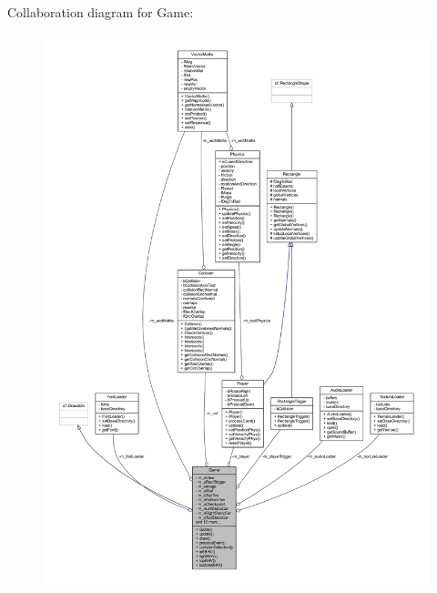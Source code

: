 Collaboration diagram for Game\+:\nopagebreak
\begin{figure}[H]
\begin{center}
\leavevmode
\includegraphics[width=350pt]{class_game__coll__graph}
\end{center}
\end{figure}
